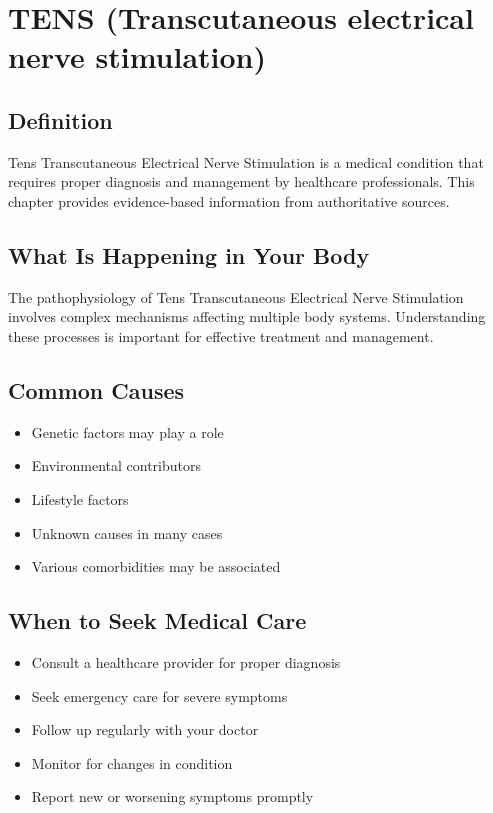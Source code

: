 
\chapter{TENS (Transcutaneous electrical nerve stimulation)}

\section*{Definition}
Tens Transcutaneous Electrical Nerve Stimulation is a medical condition that requires proper diagnosis and management by healthcare professionals. This chapter provides evidence-based information from authoritative sources.

\section*{What Is Happening in Your Body}
The pathophysiology of Tens Transcutaneous Electrical Nerve Stimulation involves complex mechanisms affecting multiple body systems. Understanding these processes is important for effective treatment and management.

\section*{Common Causes}
\begin{itemize}
  \item Genetic factors may play a role
  \item Environmental contributors
  \item Lifestyle factors
  \item Unknown causes in many cases
  \item Various comorbidities may be associated
\end{itemize}

\section*{When to Seek Medical Care}
\begin{itemize}
  \item Consult a healthcare provider for proper diagnosis
  \item Seek emergency care for severe symptoms
  \item Follow up regularly with your doctor
  \item Monitor for changes in condition
  \item Report new or worsening symptoms promptly
\end{itemize}

